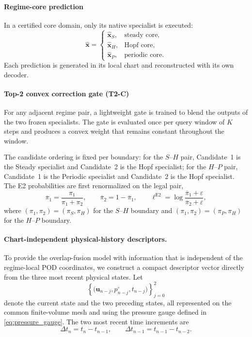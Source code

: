 \paragraph{Regime-core prediction}
In a certified core domain, only its native specialist is executed:
\begin{equation}
  \widehat{\boldsymbol{x}}
  =
  \begin{cases}
    \widehat{\boldsymbol{x}}_{S},& \text{steady core},\\
    \widehat{\boldsymbol{x}}_{H},& \text{Hopf core},\\
    \widehat{\boldsymbol{x}}_{P},& \text{periodic core}.
  \end{cases}
  \label{eq:core_top1_prediction}
\end{equation}
Each prediction is generated in its local chart and reconstructed with its
own decoder.

\paragraph{Top-2 convex correction gate (T2-C)}
For any adjacent regime pair, a lightweight gate is trained to blend the
outputs of the two frozen specialists.  The gate is evaluated once per query
window of $K$ steps and produces a convex weight that remains constant
throughout the window.

The candidate ordering is fixed per boundary: for the $S$--$H$ pair,
Candidate~1 is the Steady specialist and Candidate~2 is the Hopf specialist;
for the $H$--$P$ pair, Candidate~1 is the Periodic specialist and
Candidate~2 is the Hopf specialist.  The E2 probabilities are first
renormalized on the legal pair,
\begin{equation}
  \overline{\pi}_1
  =
  \frac{\pi_1}{\pi_1+\pi_2},
  \qquad
  \overline{\pi}_2=1-\overline{\pi}_1,
  \qquad
  \ell^{\mathrm{E2}}
  =
  \log\frac{\overline{\pi}_1+\varepsilon}
  {\overline{\pi}_2+\varepsilon},
  \label{eq:t2c_pair_logit}
\end{equation}
where $(\pi_1,\pi_2)=(\pi_S,\pi_H)$ for the $S$--$H$ boundary and
$(\pi_1,\pi_2)=(\pi_P,\pi_H)$ for the $H$--$P$ boundary.




\paragraph{Chart-independent physical-history descriptors.}

To provide the overlap-fusion model with information that is independent of
the regime-local POD coordinates, we construct a compact descriptor vector
directly from the three most recent physical states.  Let
\[
  \left\{
    \bigl(
      \boldsymbol{u}_{n-j},
      p_{n-j}^{\circ},
      t_{n-j}
    \bigr)
  \right\}_{j=0}^{2}
\]
denote the current state and the two preceding states, all represented on the
common finite-volume mesh and using the pressure gauge defined in
\eqref{eq:pressure_gauge}.  The two most recent time increments are
\begin{equation}
  \Delta t_n
  =
  t_n-t_{n-1},
  \qquad
  \Delta t_{n-1}
  =
  t_{n-1}-t_{n-2}.
  \label{eq:descriptor_time_increments}
\end{equation}

